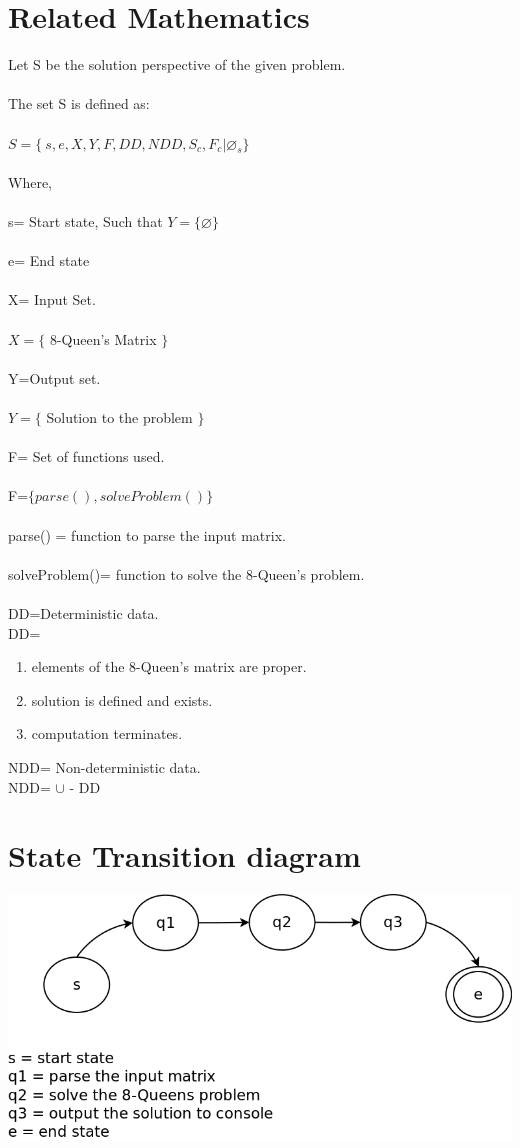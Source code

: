 \documentclass[10pt,a4paper]{article}
\begin{document}
\section{Related Mathematics}
Let S be the solution perspective of the given problem.
\\\\The set S is defined as:
\\\\$S=\lbrace\ s,e,X,Y,F,DD,NDD,S_{c},F_{c}|\varnothing_{s}\rbrace$
\\\\Where,
\\\\s= Start state,  Such that $Y=\lbrace \varnothing \rbrace$ 
\\\\e= End state 
\\\\X= Input Set.
\\\\$X=\lbrace$  8-Queen's Matrix $\rbrace$
\\\\Y=Output set.
\\\\$Y=\lbrace $ Solution to the problem $ \rbrace $
\\\\F= Set of functions used.
\\\\F=$\lbrace parse(), solveProblem() \rbrace$
\\\\parse() = function to parse the input matrix.
\\\\solveProblem()= function to solve the 8-Queen's problem.
\\\\DD=Deterministic data.
\\DD=
\begin{enumerate}
\item elements of the 8-Queen's matrix are proper.
\item solution is defined and exists.
\item computation terminates.
\end{enumerate}
NDD= Non-deterministic data.
\\NDD= $\cup$ - DD


\section{State Transition diagram}
\includegraphics[scale=0.5]{stdg.png}
\end{document}
